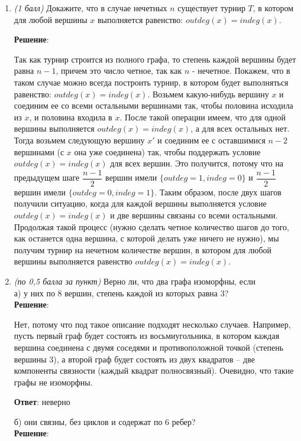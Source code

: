 \documentclass{article}
\begin{document}
\begin{enumerate}
    \item \textit{(1 балл)} Докажите, что в случае нечетных $n$ существует турнир $T$, в котором для любой вершины $x$ выполняется равенство: $outdeg(x) = indeg(x)$.
    
    \textbf{Решение}:

    Так как турнир строится из полного графа, то степень каждой вершины будет равна $n-1$, причем это число четное, так как $n$ - нечетное. Покажем, что в таком случае можно всегда построить турнир, в котором будет выполняться равенство: $outdeg(x) = indeg(x)$. Возьмем какую-нибудь вершину $x$ и соединим ее со всеми остальными вершинами так, чтобы половина исходила из $x$, и половина входила в $x$. После такой операции имеем, что для одной вершины выполняется $outdeg(x) = indeg(x)$, а для всех остальных нет. Тогда возьмем следующую вершину $x'$ и соединим ее с оставшимися $n-2$ вершинами (с $x$ она уже соединена) так, чтобы поддержать условие $outdeg(x) = indeg(x)$ для всех вершин. Это получится, потому что на предыдущем шаге $\dfrac{n-1}{2}$ вершин имели $\{outdeg = 1, indeg = 0\}$ и $\dfrac{n-1}{2}$ вершин имели $\{outdeg = 0, indeg = 1\}$. Таким образом, после двух шагов получили ситуацию, когда для каждой вершины выполняется условие $outdeg(x) = indeg(x)$ и две вершины связаны со всеми остальными. Продолжая такой процесс (нужно сделать четное количество шагов до того, как останется одна вершина, с которой делать уже ничего не нужно), мы получим турнир на нечетном количестве вершин, в котором для любой вершины выполняется равенство $outdeg(x) = indeg(x)$.
    
    \item \textit{(по 0,5 балла за пункт)} Верно ли, что два графа изоморфны, если\\
    а) у них по 8 вершин, степень каждой из которых равна 3?\\
    \textbf{Решение}:

    Нет, потому что под такое описание подходят несколько случаев. Например, пусть первый граф будет состоять из восьмиугольника, в котором каждая вершина соединена с двумя соседями и противоположной точкой (степень вершины 3), а второй граф будет состоять из двух квадратов -- две компоненты связности (каждый квадрат полносвязный). Очевидно, что такие графы не изоморфны.

    \textbf{Ответ}:
    неверно

    б) они связны, без циклов и содержат по 6 ребер?\\
    \textbf{Решение}:


\end{enumerate}
\end{document}
